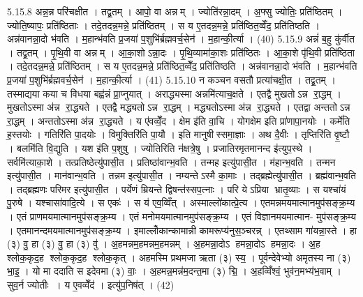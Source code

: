 5.15.8
अन्न॒न्न परि॑चक्षीत । तद्व्र॒तम् । आपो॒ वा अन्नम् । ज्योति॑रन्ना॒दम् । अ॒फ्सु ज्योतिः॒ प्रति॑ष्ठितम् । ज्योति॒ष्यापः॒ प्रति॑ष्ठिताः । तदे॒तदन्न॒मन्ने॒ प्रति॑ष्ठितम् । स य ए॒तदन्न॒मन्ने॒ प्रति॑ष्ठित॒व्वेँद॒ प्रति॑तिष्ठति । अन्न॑वानन्ना॒दो भ॑वति । म॒हान्भ॑वति प्र॒जया॑ प॒शुभि॑र्ब्रह्मवर्च॒सेन॑ । म॒हान्की॒र्त्या । (40)
5.15.9
अन्नं॑ ब॒हु कु॑र्वीत । तद्व्र॒तम् । पृ॒थि॒वी वा अन्नम् । आ॒का॒शोऽन्ना॒दः । पृ॒थि॒व्यामा॑का॒शः प्रति॑ष्ठितः । आ॒का॒शे पृ॑थि॒वी प्रति॑ष्ठिता । तदे॒तदन्न॒मन्ने॒ प्रति॑ष्ठितम् । स य ए॒तदन्न॒मन्ने॒ प्रति॑ष्ठित॒व्वेँद॒ प्रति॑तिष्ठति । अन्न॑वानन्ना॒दो भ॑वति । म॒हान्भ॑वति प्र॒जया॑ प॒शुभि॑र्ब्रह्मवर्च॒सेन॑ । म॒हान्की॒र्त्या । (41)
5.15.10
न कञ्चन वसतौ प्रत्या॑चक्षी॒त । तद्व्र॒तम् । तस्माद्यया कया च विधया बह्व॑न्नं प्रा॒प्नुयात् । अराद्ध्यस्मा अन्नमि॑त्याच॒क्षते । एतद्वै मुखतोऽन्न रा॒द्धम् । मुखतोऽस्मा अ॑न्न रा॒द्ध्यते । एतद्वै मद्ध्यतोऽन्न रा॒द्धम् । मद्ध्यतोऽस्मा अ॑न्न रा॒द्ध्यते । एतद्वा अन्ततोऽन्न रा॒द्धम् । अन्ततोऽस्मा अ॑न्न रा॒द्ध्यते । य ए॑वव्वेँ॒द । क्षेम इ॑ति वा॒चि । योगक्षेम इति प्रा॑णापा॒नयोः । कर्मे॑ति ह॒स्तयोः । गतिरि॑ति पा॒दयोः । विमुक्तिरि॑ति पा॒यौ । इति मानुषीस्समा॒ज्ञाः । अथ दै॒वीः । तृप्तिरि॑ति वृ॒ष्टौ । बलमि॑ति वि॒द्युति । यश इ॑ति प॒शुषु । ज्योतिरिति न॑क्षत्रे॒षु । प्रजातिरमृतमानन्द इ॑त्युप॒स्थे । सर्वमि॑त्याका॒शे । तत्प्रतिष्ठेत्यु॑पासी॒त । प्रतिष्ठा॑वान्भ॒वति । तन्मह इत्यु॑पासी॒त । म॑हान्भ॒वति । तन्मन इत्यु॑पासी॒त । मान॑वान्भ॒वति । तन्नम इत्यु॑पासी॒त । नम्यन्तेऽस्मै का॒माः । तद्ब्रह्मेत्यु॑पासी॒त । ब्रह्म॑वान्भ॒वति । तद्ब्रह्मणः परिमर इत्यु॑पासी॒त । पर्येणं म्रियन्ते द्विषन्त॑स्सप॒त्नाः । परि येऽप्रिया भ्रातृ॒व्याः । स यश्चा॑यं पु॒रुषे । यश्चासा॑वादि॒त्ये । स एकः॑ । स य॑ एव॒व्विँत् । अस्माल्लो॑कात्प्रे॒त्य । एतमन्नमयमात्मानमुप॑सङ्क्र॒म्य । एतं प्राणमयमात्मानमुप॑सङ्क्र॒म्य । एतं मनोमयमात्मानमुप॑सङ्क्र॒म्य । एतं विज्ञानमयमात्मान- मुप॑सङ्क्र॒म्य । एतमानन्दमयमात्मानमुप॑सङ्क्र॒म्य । इमाल्लोँकान्कामान्नी कामरूप्य॑नुस॒ञ्चरन्न् । एतथ्साम गा॑यन्ना॒स्ते । हा (३) वु॒ हा (३) वु॒ हा (३) वु॑ । अ॒हमन्नम॒हमन्नम॒हमन्नम् । अ॒हमन्ना॒दोऽ हमन्ना॒दोऽ हमन्ना॒दः । अ॒ह श्लोक॒कृद॒ह श्लोक॒कृद॒ह श्लोक॒कृत् । अहमस्मि प्रथमजा ऋता (३) स्य॒ । पूर्वन्देवेभ्यो अमृतस्य ना (३) भा॒इ॒ । यो मा ददाति स इदेवमा (३) वाः॒ । अ॒हमन्न॒मन्न॑म॒दन्त॒मा (३) द्मि॒ । अ॒हव्विँश्वं॒ भुव॑न॒मभ्य॑भ॒वाम् । सुव॒र्न ज्योतीः । य ए॒वव्वेँद॑ । इत्यु॑प॒निष॑त् । (42)

